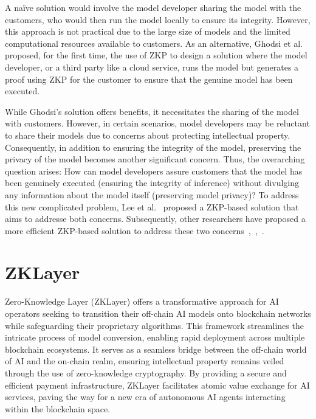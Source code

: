 \documentclass[conference]{IEEEtran}
\begin{document}
A naïve solution would involve the model developer sharing the model with the customers, who would then run the model locally to ensure its integrity. However, this approach is not practical due to the large size of models and the limited computational resources available to customers. As an alternative, Ghodsi et al.~\cite{Ghodsi2017SafetyNetsVE} proposed, for the first time, the use of ZKP to design a solution where the model developer, or a third party like a cloud service, runs the model but generates a proof using ZKP for the customer to ensure that the genuine model has been executed.

While Ghodsi's solution offers benefits, it necessitates the sharing of the model with customers. However, in certain scenarios, model developers may be reluctant to share their models due to concerns about protecting intellectual property. Consequently, in addition to ensuring the integrity of the model, preserving the privacy of the model becomes another significant concern. Thus, the overarching question arises: How can model developers assure customers that the model has been genuinely executed (ensuring the integrity of inference) without divulging any information about the model itself (preserving model privacy)? To address this new complicated problem, Lee et al.~\cite{Lee2020vCNNVC} proposed a ZKP-based solution that aims to addresse both concerns. Subsequently, other researchers have proposed a more efficient ZKP-based solution to address these two concerns~\cite{Liu2021zkCNNZK},~\cite{Feng2021ZENAO},~\cite{Ju2021EfficientSP}.




\section{ZKLayer}

Zero-Knowledge Layer (ZKLayer) offers a transformative approach for AI operators seeking to transition their off-chain AI models onto blockchain networks while safeguarding their proprietary algorithms. This framework streamlines the intricate process of model conversion, enabling rapid deployment across multiple blockchain ecosystems. It serves as a seamless bridge between the off-chain world of AI and the on-chain realm, ensuring intellectual property remains veiled through the use of zero-knowledge cryptography. By providing a secure and efficient payment infrastructure, ZKLayer facilitates atomic value exchange for AI services, paving the way for a new era of autonomous AI agents interacting within the blockchain space.
\end{document}
